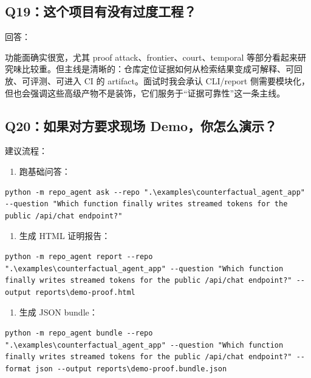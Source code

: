 \documentclass[UTF8,12pt,openany]{ctexbook}
\begin{document}
\subsection{Q19：这个项目有没有过度工程？}

回答：\par

功能面确实很宽，尤其 proof attack、frontier、court、temporal 等部分看起来研究味比较重。但主线是清晰的：仓库定位证据如何从检索结果变成可解释、可回放、可评测、可进入 CI 的 artifact。面试时我会承认 CLI/report 侧需要模块化，但也会强调这些高级产物不是装饰，它们服务于“证据可靠性”这一条主线。\par

\subsection{Q20：如果对方要求现场 Demo，你怎么演示？}

建议流程：\par

\begin{enumerate}
\item 跑基础问答：
\end{enumerate}

\begin{lstlisting}
python -m repo_agent ask --repo ".\examples\counterfactual_agent_app" --question "Which function finally writes streamed tokens for the public /api/chat endpoint?"
\end{lstlisting}

\begin{enumerate}
\item 生成 HTML 证明报告：
\end{enumerate}

\begin{lstlisting}
python -m repo_agent report --repo ".\examples\counterfactual_agent_app" --question "Which function finally writes streamed tokens for the public /api/chat endpoint?" --output reports\demo-proof.html
\end{lstlisting}

\begin{enumerate}
\item 生成 JSON bundle：
\end{enumerate}

\begin{lstlisting}
python -m repo_agent bundle --repo ".\examples\counterfactual_agent_app" --question "Which function finally writes streamed tokens for the public /api/chat endpoint?" --format json --output reports\demo-proof.bundle.json
\end{lstlisting}
\end{document}
